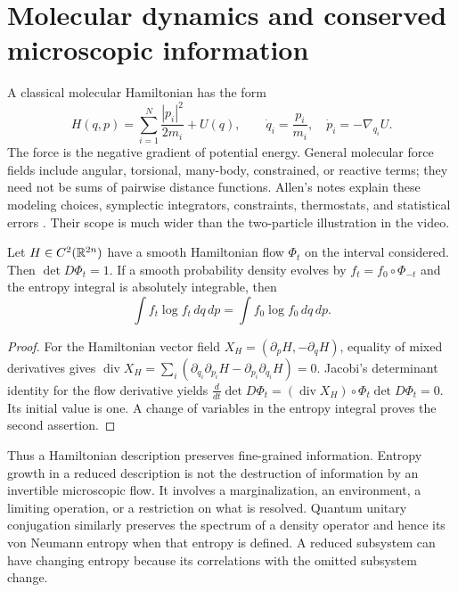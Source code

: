 \section{Molecular dynamics and conserved microscopic information}

A classical molecular Hamiltonian has the form
\begin{equation}
 H(q,p)=\sum_{i=1}^N\frac{|p_i|^2}{2m_i}+U(q),\qquad
 \dot q_i=\frac{p_i}{m_i},\quad
 \dot p_i=-\nabla_{q_i}U.
 \label{eq:micro-md}
\end{equation}
The force is the negative gradient of potential energy.  General
molecular force fields include angular, torsional, many-body, constrained,
or reactive terms; they need not be sums of pairwise distance functions.
Allen's notes explain these modeling choices, symplectic integrators,
constraints, thermostats, and statistical errors
\citep{microAllen2004}.  Their scope is much wider than the two-particle
illustration in the video.

\begin{proposition}
\label{prop:micro-liouville}
Let $H\in C^2(\mathbb{R}^{2n})$ have a smooth Hamiltonian flow $\Phi_t$
on the interval considered.  Then $\det D\Phi_t=1$.
If a smooth probability density evolves by
$f_t=f_0\circ\Phi_{-t}$ and the entropy integral is absolutely
integrable, then
\[
 \int f_t\log f_t\,dq\,dp
 =\int f_0\log f_0\,dq\,dp.
\]
\end{proposition}
\begin{proof}
For the Hamiltonian vector field
$X_H=(\partial_pH,-\partial_qH)$, equality of mixed derivatives
gives
$\operatorname{div}X_H=\sum_i(\partial_{q_i}\partial_{p_i}H-
\partial_{p_i}\partial_{q_i}H)=0$.
Jacobi's determinant identity for the flow derivative yields
$\frac d{dt}\det D\Phi_t=(\operatorname{div}X_H)\circ\Phi_t
\det D\Phi_t=0$.  Its initial value is one.  A change of variables
in the entropy integral proves the second assertion.
\end{proof}

Thus a Hamiltonian description preserves fine-grained information.
Entropy growth in a reduced description is not the destruction of
information by an invertible microscopic flow.  It involves a
marginalization, an environment, a limiting operation, or a restriction
on what is resolved.  Quantum unitary conjugation similarly preserves
the spectrum of a density operator and hence its von Neumann entropy
when that entropy is defined.  A reduced subsystem can have changing
entropy because its correlations with the omitted subsystem change.

